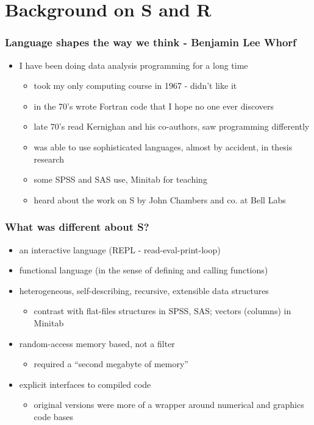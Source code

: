 \documentclass[pdf]{beamer}
\begin{document}
  \section{Background on S and R}
  \begin{frame}\frametitle{Language shapes the way we think - Benjamin Lee Whorf}
    \begin{itemize}
      \pause
      \item I have been doing data analysis programming for a long time
      \begin{itemize}
        \pause
        \item took my only computing course in 1967 - didn't like it
        \pause
        \item in the 70's wrote Fortran code that I hope no one ever discovers
        \pause
        \item late 70's read Kernighan and his co-authors, saw programming
        differently
        \pause
        \item was able to use sophisticated languages, almost by accident, in
        thesis research
        \pause
        \item some SPSS and SAS use, Minitab for teaching
        \pause
        \item heard about the work on S by John Chambers and co. at Bell Labs
      \end{itemize}
    \end{itemize}
  \end{frame}

  \begin{frame}\frametitle{What was different about S?}
    \begin{itemize}
      \pause
      \item
      an interactive language (REPL - read-eval-print-loop)
      \pause
      \item functional language (in the sense of defining and calling functions)
      \pause
      \item
      heterogeneous, self-describing, recursive, extensible data structures
      \begin{itemize}
        \pause
        \item
        contrast with flat-files structures in SPSS, SAS; vectors (columns)
        in Minitab
      \end{itemize}
      \pause
      \item
      random-access memory based, not a filter
      \begin{itemize}
        \pause
        \item required a ``second megabyte of memory''
      \end{itemize}
      \pause
      \item explicit interfaces to compiled code
        \begin{itemize}
        \pause
        \item
          original versions were more of a wrapper around numerical and
          graphics code bases
        \end{itemize}
    \end{itemize}
  \end{frame}
\end{document}
